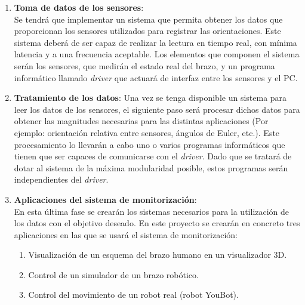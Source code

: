 \documentclass[12pt, a4paper]{report}
\begin{document}
\begin{enumerate}
\item \textbf{Toma de datos de los sensores}: \\
Se tendrá que implementar un sistema que permita obtener los datos que proporcionan los sensores utilizados para registrar las orientaciones. Este sistema deberá de ser capaz de realizar la lectura en tiempo real, con mínima latencia y a una frecuencia aceptable. Los elementos que componen el sistema serán los sensores, que medirán el estado real del brazo, y un programa informático llamado \textit{driver} que actuará de interfaz entre los sensores y el PC. \\

\item \textbf{Tratamiento de los datos}: Una vez se tenga disponible un sistema para leer los datos de los sensores, el siguiente paso será procesar dichos datos para obtener las magnitudes necesarias para las distintas aplicaciones (Por ejemplo: orientación relativa entre sensores, ángulos de Euler, etc.). Este procesamiento lo llevarán a cabo uno o varios programas informáticos que tienen que ser capaces de comunicarse con el \textit{driver}. Dado que se tratará de dotar al sistema de la máxima modularidad posible, estos programas serán independientes del \textit{driver}.\\

\item \textbf{Aplicaciones del sistema de monitorización}: \\
En esta última fase se crearán los sistemas necesarios para la utilización de los datos con el objetivo deseado. En este proyecto se crearán en concreto tres aplicaciones en las que se usará el sistema de monitorización:

\begin{enumerate}

\item Visualización de un esquema del brazo humano en un visualizador 3D.

\item Control de un simulador de un brazo robótico.

\item Control del movimiento de un robot real (robot YouBot).

\end{enumerate}

\end{enumerate}
\end{document}
